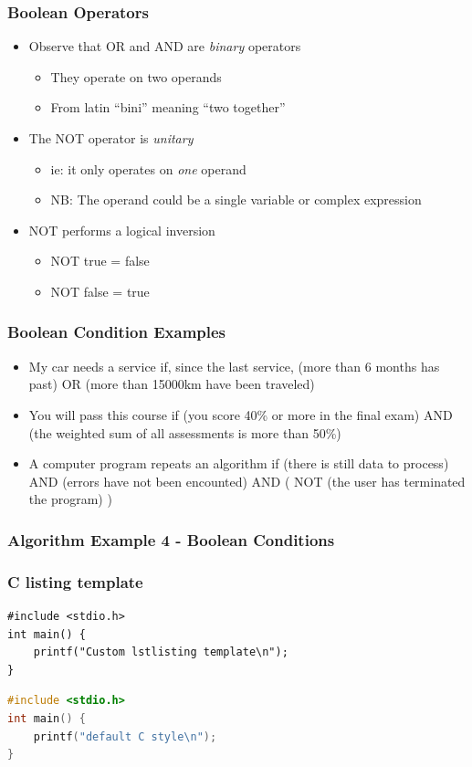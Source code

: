 \documentclass[14pt]{beamer}
\begin{document}
\begin{frame} %
\frametitle{Boolean Operators}
\begin{itemize}
\item Observe that OR and AND are \textit{binary} operators
	\begin{itemize}
		\item They operate on two operands
		\item From latin ``bini'' meaning ``two together''
	\end{itemize}
\item The NOT operator is \textit{unitary}
	\begin{itemize}
		\item ie: it only operates on \textit{one} operand
		\item NB: The operand could be a single variable or complex expression
	\end{itemize}
\item NOT performs a logical inversion
	\begin{itemize}
		\item NOT true = false
		\item NOT false = true
	\end{itemize}
\end{itemize}
\end{frame}

\begin{frame} %
\frametitle{Boolean Condition Examples}

\begin{itemize}
	\item My car needs a service if, since the last service, (more than 6 months has past) OR (more than 15000km have been traveled)
	\item You will pass this course if (you score 40\% or more in the final exam) AND (the weighted sum of all assessments is more than 50\%)
	\item A computer program repeats an algorithm if (there is still data to process) AND (errors have not been encounted) AND ( NOT (the user has terminated the program) )
\end{itemize}
\end{frame}

\begin{frame}
\frametitle{Algorithm Example 4 - Boolean Conditions}

\end{frame}

\begin{frame}[fragile] %
\frametitle{C listing template}
\begin{lstlisting}[style=CStyle]
#include <stdio.h>
int main() {
	printf("Custom lstlisting template\n");
}
\end{lstlisting}

\begin{lstlisting}[language=c]
#include <stdio.h>
int main() {
	printf("default C style\n");
}
\end{lstlisting}
\end{frame}
\end{document}
